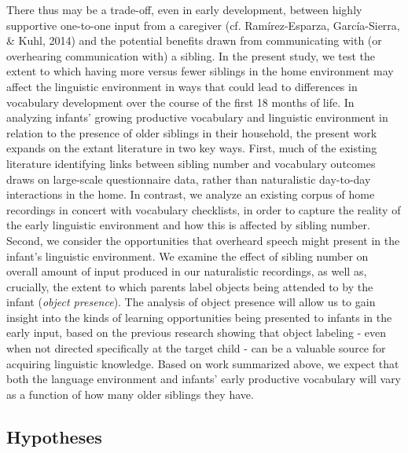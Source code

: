 \documentclass[
  man,mask,floatsintext]{apa6}
\begin{document}
There thus may be a trade-off, even in early development, between highly supportive one-to-one input from a caregiver (cf. Ramírez-Esparza, García-Sierra, \& Kuhl, 2014) and the potential benefits drawn from communicating with (or overhearing communication with) a sibling. In the present study, we test the extent to which having more versus fewer siblings in the home environment may affect the linguistic environment in ways that could lead to differences in vocabulary development over the course of the first 18 months of life. In analyzing infants' growing productive vocabulary and linguistic environment in relation to the presence of older siblings in their household, the present work expands on the extant literature in two key ways. First, much of the existing literature identifying links between sibling number and vocabulary outcomes draws on large-scale questionnaire data, rather than naturalistic day-to-day interactions in the home. In contrast, we analyze an existing corpus of home recordings in concert with vocabulary checklists, in order to capture the reality of the early linguistic environment and how this is affected by sibling number. Second, we consider the opportunities that overheard speech might present in the infant's linguistic environment. We examine the effect of sibling number on overall amount of input produced in our naturalistic recordings, as well as, crucially, the extent to which parents label objects being attended to by the infant (\emph{object presence}). The analysis of object presence will allow us to gain insight into the kinds of learning opportunities being presented to infants in the early input, based on the previous research showing that object labeling - even when not directed specifically at the target child - can be a valuable source for acquiring linguistic knowledge. Based on work summarized above, we expect that both the language environment and infants' early productive vocabulary will vary as a function of how many older siblings they have.

\hypertarget{hypotheses}{%
\subsection{Hypotheses}\label{hypotheses}}
\end{document}
